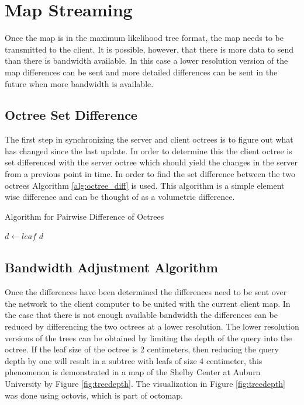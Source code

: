 \documentclass[12pt]{report}
\begin{document}
\section{Map Streaming}
Once the map is in the maximum likelihood tree format, the map needs to be transmitted to the client. It is possible, however, that there is more data to send than there is bandwidth available. In this case a lower resolution version of the map differences can be sent and more detailed differences can be sent in the future when more bandwidth is available.

\subsection{Octree Set Difference}
The first step in synchronizing the server and client octrees is to figure out what has changed since the last update. In order to determine this the client octree is set differenced with the server octree which should yield the changes in the server from a previous point in time. In order to find the set difference between the two octrees Algorithm \ref{alg:octree_diff} is used. This algorithm is a simple element wise difference and can be thought of as a volumetric difference.

\begin{algorithm}
\caption{Algorithm for Pairwise Difference of Octrees}
\label{alg:octree_diff}
\begin{algorithmic}
  \STATE {}
  \STATE {}
  \STATE {}
      \STATE $d\gets leaf$
    \ENDIF
  \ENDFOR
  \RETURN $d$
\end{algorithmic}
\end{algorithm}

\subsection{Bandwidth Adjustment Algorithm}
Once the differences have been determined the differences need to be sent over the network to the client computer to be united with the current client map. In the case that there is not enough available bandwidth the differences can be reduced by differencing the two octrees at a lower resolution. The lower resolution versions of the trees can be obtained by limiting the depth of the query into the octree. If the leaf size of the octree is 2 centimeters, then reducing the query depth by one will result in a subtree with leafs of size 4 centimeter, this phenomenon is demonstrated in a map of the Shelby Center at Auburn University by Figure \ref{fig:treedepth}.  The visualization in Figure \ref{fig:treedepth} was done using octovis\cite{octomap}, which is part of octomap.
\end{document}
